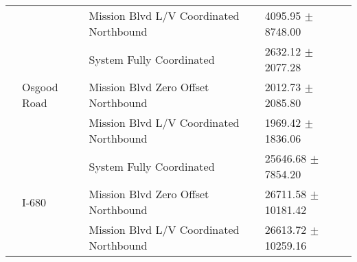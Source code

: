 \begin{tabular}{llll}
 &  & Mission Blvd L/V Coordinated Northbound & 4095.95 $\pm$ 8748.00 \\
 & \multirow[t]{3}{*}{Osgood Road} & System Fully Coordinated & 2632.12 $\pm$ 2077.28 \\
 &  & Mission Blvd Zero Offset Northbound & 2012.73 $\pm$ 2085.80 \\
 &  & Mission Blvd L/V Coordinated Northbound & 1969.42 $\pm$ 1836.06 \\
 & \multirow[t]{3}{*}{I-680} & System Fully Coordinated & 25646.68 $\pm$ 7854.20 \\
 &  & Mission Blvd Zero Offset Northbound & 26711.58 $\pm$ 10181.42 \\
 &  & Mission Blvd L/V Coordinated Northbound & 26613.72 $\pm$ 10259.16 \\
\bottomrule
\end{tabular}
